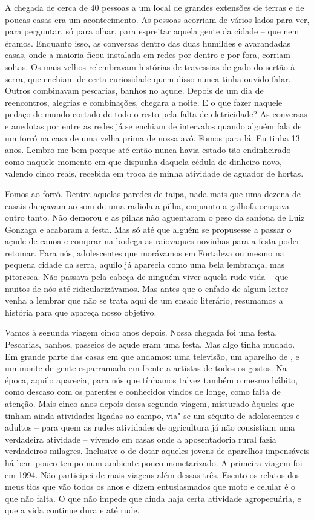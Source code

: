 {A chegada de cerca de 40 pessoas a um local de grandes extensões de
terras e de poucas casas era um acontecimento. As pessoas acorriam de
vários lados para ver, para perguntar, só para olhar, para espreitar
aquela gente da cidade -- que nem éramos. Enquanto isso, as conversas
dentro das duas humildes e avarandadas casas, onde a maioria ficou
instalada em redes por dentro e por fora, corriam soltas. Os mais velhos
relembravam histórias de travessias de gado do sertão à serra, que
enchiam de certa curiosidade quem disso nunca tinha ouvido falar. Outros
combinavam pescarias, banhos no açude. Depois de um dia de reencontros,
alegrias e combinações, chegara a noite. E o que fazer naquele pedaço de
mundo cortado de todo o resto pela falta de eletricidade? As conversas e
anedotas por entre as redes já se enchiam de intervalos quando alguém
fala de um forró na casa de uma velha prima de nossa avó. Fomos para lá.
Eu tinha 13 anos. Lembro-me bem porque até então nunca havia estado tão
endinheirado como naquele momento em que dispunha daquela cédula de
dinheiro novo, valendo cinco reais, recebida em troca de minha atividade
de aguador de hortas.

Fomos ao forró. Dentre aquelas paredes de taipa, nada mais que uma dezena de casais
dançavam ao som de uma radiola a pilha, enquanto a galhofa ocupava outro
tanto. Não demorou e as pilhas não aguentaram o peso da sanfona de Luiz
Gonzaga e acabaram a festa. Mas só até que alguém se propusesse a passar
o açude de canoa e comprar na bodega as raiovaques novinhas para a festa
poder retomar. Para nós, adolescentes que morávamos em Fortaleza ou
mesmo na pequena cidade da serra, aquilo já aparecia como uma bela
lembrança, mas pitoresca. Não passava pela cabeça de ninguém viver
aquela rude vida -- que muitos de nós até ridicularizávamos. Mas antes
que o enfado de algum leitor venha a lembrar que não se trata aqui de
um ensaio literário, resumamos a história para que apareça nosso objetivo.

Vamos à segunda viagem cinco anos depois. Nossa chegada foi uma festa.
Pescarias, banhos, passeios de açude eram uma festa. Mas algo tinha
mudado. Em grande parte das casas em que andamos: uma televisão, um
aparelho de , e um monte de gente esparramada em frente a artistas de
todos os gostos. Na época, aquilo aparecia, para nós que tínhamos talvez
também o mesmo hábito, como descaso com os parentes e conhecidos vindos
de longe, como falta de atenção. Mais cinco anos depois dessa segunda
viagem, misturado àqueles que tinham ainda atividades ligadas ao campo,
via"-se um séquito de adolescentes e adultos -- para quem as rudes
atividades de agricultura já não consistiam uma verdadeira atividade --
vivendo em casas onde a aposentadoria rural fazia verdadeiros milagres.
Inclusive o de dotar aqueles jovens de aparelhos impensáveis há bem
pouco tempo num ambiente pouco monetarizado. A primeira viagem foi em
1994. Não participei de mais viagens além dessas três. Escuto os relatos
dos meus tios que vão todos os anos e dizem entusiasmados que moto e
celular é o que não falta. O que não impede que ainda haja certa
atividade agropecuária, e que a vida continue dura e até rude.

}
